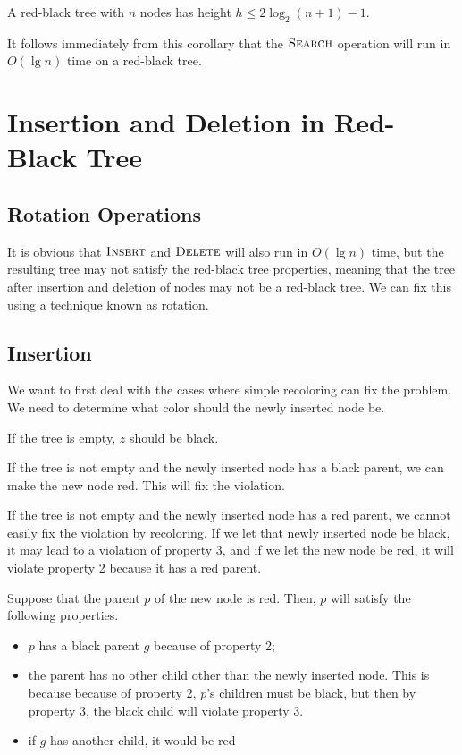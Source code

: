 \begin{corollary}
    A red-black tree with $n$ nodes has height $h \leq 2\log_2 (n+1)-1$. 
\end{corollary}

It follows immediately from this corollary that the $\textsc{Search}$ operation will run in $O(\lg n)$ time on a red-black tree.

\section{Insertion and Deletion in Red-Black Tree}

\subsection{Rotation Operations}

It is obvious that $\textsc{Insert}$ and $\textsc{Delete}$ will also run in $O(\lg n)$ time, but the resulting tree may not satisfy the red-black tree properties, meaning that the tree after insertion and deletion of nodes may not be a red-black tree. We can fix this using a technique known as rotation.

\subsection{Insertion}

\begin{codebox}
\end{codebox}

We want to first deal with the cases where simple recoloring can fix the problem. We need to determine what color should the newly inserted node be.

If the tree is empty, $z$ should be black. 

If the tree is not empty and the newly inserted node has a black parent, we can make the new node red. This will fix the violation.

If the tree is not empty and the newly inserted node has a red parent, we cannot easily fix the violation by recoloring. If we let that newly inserted node be black, it may lead to a violation of property 3, and if we let the new node be red, it will violate property 2 because it has a red parent.

Suppose that the parent $p$ of the new node is red. Then, $p$ will satisfy the following properties.

\begin{itemize}
    \item $p$ has a black parent $g$ because of property 2;
    \item the parent has no other child other than the newly inserted node. This is because because of property 2, $p$'s children must be black, but then by property 3, the black child will violate property 3.
    \item if $g$ has another child, it would be red
\end{itemize}

